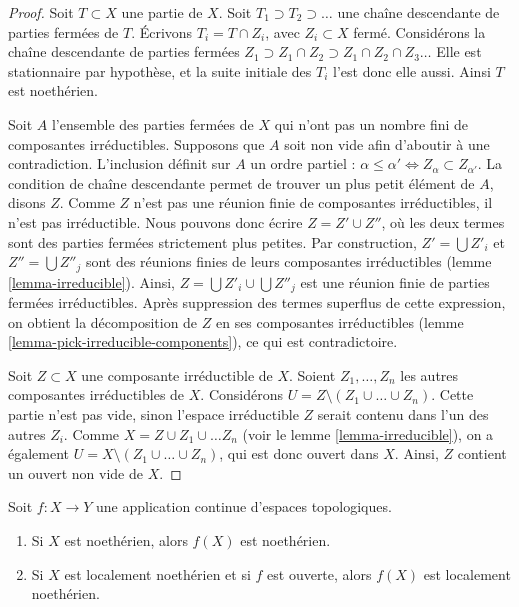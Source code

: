 \begin{proof}
Soit $T \subset X$ une partie de $X$.
Soit $T_1 \supset T_2 \supset \ldots$ une chaîne descendante de parties
fermées de $T$. Écrivons $T_i =  T \cap Z_i$, avec $Z_i \subset X$ fermé.
Considérons la chaîne descendante de parties fermées
$Z_1 \supset Z_1\cap Z_2 \supset Z_1 \cap Z_2 \cap Z_3 \ldots$
Elle est stationnaire par hypothèse, et la suite initiale des $T_i$ l'est donc
elle aussi. Ainsi $T$ est noethérien.

\medskip\noindent
Soit $A$ l'ensemble des parties fermées de $X$ qui n'ont pas un nombre fini de
composantes irréductibles. Supposons que $A$ soit non vide afin d'aboutir à une
contradiction. L'inclusion définit sur $A$ un ordre partiel :
$\alpha \leq \alpha' \Leftrightarrow Z_{\alpha} \subset Z_{\alpha'}$.
La condition de chaîne descendante permet de trouver un plus petit élément de
$A$, disons $Z$. Comme $Z$ n'est pas une réunion finie de composantes
irréductibles, il n'est pas irréductible. Nous pouvons donc écrire
$Z = Z' \cup Z''$, où les deux termes sont des parties fermées strictement plus
petites. Par construction, $Z' = \bigcup Z'_i$ et
$Z'' = \bigcup Z''_j$ sont des réunions finies de leurs composantes
irréductibles (lemme \ref{lemma-irreducible}). Ainsi,
$Z = \bigcup Z'_i \cup \bigcup Z''_j$ est une réunion finie de parties fermées
irréductibles. Après suppression des termes superflus de cette expression, on
obtient la décomposition de $Z$ en ses composantes irréductibles (lemme
\ref{lemma-pick-irreducible-components}), ce qui est contradictoire.

\medskip\noindent
Soit $Z \subset X$ une composante irréductible de $X$.
Soient $Z_1, \ldots, Z_n$ les autres composantes irréductibles de $X$.
Considérons $U = Z \setminus (Z_1\cup\ldots\cup Z_n)$.
Cette partie n'est pas vide, sinon l'espace irréductible $Z$ serait contenu
dans l'un des autres $Z_i$. Comme
$X = Z \cup Z_1 \cup \ldots Z_n$ (voir le lemme \ref{lemma-irreducible}), on a
également $U = X \setminus (Z_1\cup\ldots\cup Z_n)$, qui est donc ouvert dans
$X$. Ainsi, $Z$ contient un ouvert non vide de $X$.
\end{proof}

\begin{lemma}
\label{lemma-image-Noetherian}
Soit $f : X \to Y$ une application continue d'espaces topologiques.
\begin{enumerate}
\item Si $X$ est noethérien, alors $f(X)$ est noethérien.
\item Si $X$ est localement noethérien et si $f$ est ouverte, alors $f(X)$ est
localement noethérien.
\end{enumerate}
\end{lemma}

